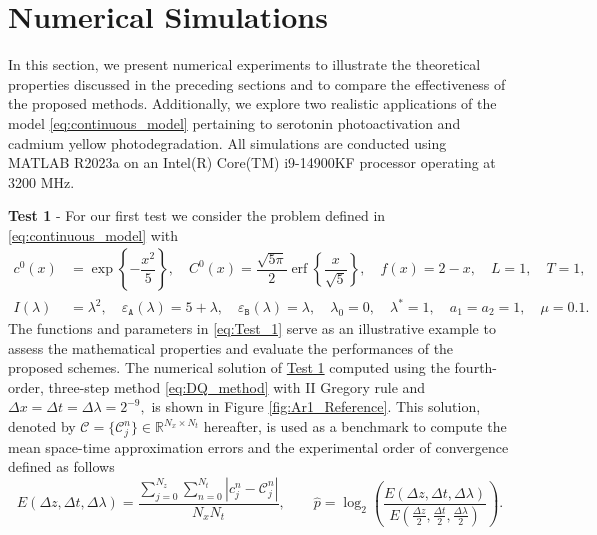 \documentclass[a4paper, UKenglish, numberwithinsect, thm-restate]{tgdk-v2021}
\DeclareMathOperator\erf{erf}
\begin{document}
\section{Numerical Simulations}\label{sec: Numerical_Simulations}
In this section, we present numerical experiments to illustrate the theoretical properties discussed in the preceding sections and to compare the effectiveness of the proposed methods. Additionally, we explore two realistic applications of the model \eqref{eq:continuous_model} pertaining to serotonin photoactivation and cadmium yellow photodegradation. All simulations are conducted using MATLAB R2023a on an Intel(R) Core(TM) i9-14900KF processor operating at 3200 MHz.

\medskip

\textbf{Test 1}\label{defn: Test_1} - For our first test we consider the problem defined in \eqref{eq:continuous_model} with 
\begin{equation}\label{eq:Test_1}
    \begin{split}
        c^0(x)&=\exp\left\{-\dfrac{x^2}{5}\right\}, \quad C^0(x)= \dfrac{\sqrt{5\pi}}{2}\erf{\left\{\dfrac{x}{\sqrt{5}}\right\}}, \quad  f(x)=2-x, \quad  L=1, \quad T=1, \\
        I(\lambda)&=\lambda^2, \quad  \varepsilon_\texttt{A}(\lambda)=5+\lambda, \quad \varepsilon_\texttt{B}(\lambda)=\lambda , \quad  \lambda_0=0, \quad  \lambda^*=1, \quad  a_1=a_2=1, \quad \mu=0.1.  
    \end{split}
\end{equation}
The functions and parameters in \eqref{eq:Test_1} serve as an illustrative example to assess the mathematical properties and evaluate the performances of the proposed schemes. The numerical solution of \hyperref[defn: Test_1]{Test 1} computed using the fourth-order, three-step method \eqref{eq:DQ_method} with II Gregory rule and $\Delta x=\Delta t=\Delta \lambda=2^{-9},$ is shown in Figure \ref{fig:Ar1_Reference}. This solution, denoted by $\bm{\mathcal{C}}=\{\mathcal{C}_j^n\}\in \mathbb{R}^{N_x \times N_t}$ hereafter, is used as a benchmark to compute the mean space-time approximation errors and the experimental order of convergence  defined as follows\begin{equation}\label{eq:Error_mean_formulation}
        E(\Delta z, \Delta t, \Delta \lambda)=\dfrac{\sum_{j=0}^{N_z}\sum_{n=0}^{N_t} \left|c_j^n-\mathcal{C}_j^n\right|}{N_xN_t}, \qquad \hat{p}=\log_2\left(\dfrac{E(\Delta z, \Delta t, \Delta \lambda)}{E(\frac{\Delta z}{2}, \frac{\Delta t}{2}, \frac{\Delta \lambda}{2})}\right).
\end{equation}
\end{document}
